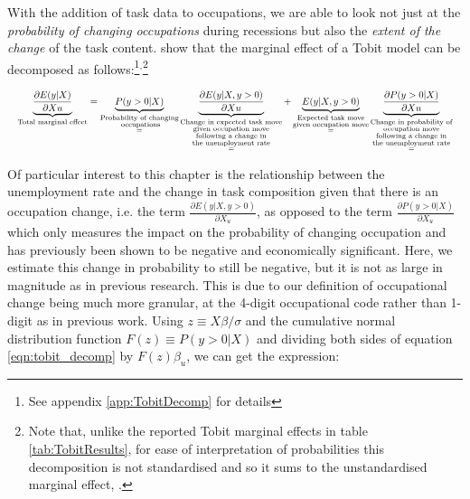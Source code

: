 \documentclass[11pt, oneside]{article}
\begin{document}
With the addition of task data to occupations, we are able to look not just at the \textit{probability of changing occupations} during recessions but also the \textit{extent of the change} of the task content. \cite{Mcdonald1980} show that the marginal effect of a Tobit model can be decomposed as follows:\footnote{See appendix \ref{app:TobitDecomp} for details}$^{,}$\footnote{Note that, unlike the reported Tobit marginal effects in table \ref{tab:TobitResults}, for ease of interpretation of probabilities this decomposition is not standardised and so it sums to the unstandardised marginal effect, \hspace{-1mm}.}


\begin{equation}
\resizebox{\columnwidth}{!}{$\displaystyle
	\label{eqn:tobit_decomp}
	\underbrace{\frac{\partial E(y| X)}{\partial Xu}}_{\text{Total marginal effect}} = \underbrace{P(y>0|X)}_{\substack{\text{Probability of changing} \\ \text{ occupations}\\=}}\underbrace{\frac{\partial E(y|X, y>0)}{\partial Xu}}_{\substack{\text{Change in expected task move} \\ \text{given occupation move} \\ \text{following a change in} \\ \text{the unemployment rate} \\ =}} + \underbrace{ E(y|X, y>0)}_{\substack{\text{Expected task move} \\ \text{given occupation move}\\=}} \underbrace{\frac{\partial P(y>0|X)}{\partial Xu}}_{\substack{\text{Change in probability of} \\ \text{occupation move}  \\ \text{following a change in} \\ \text{the unemployment rate}\\=}}
	$}
\end{equation}


\vspace{3mm}
Of particular interest to this chapter is the relationship between the unemployment rate and the change in task composition given that there is an occupation change, i.e. the term $\frac{\partial E(y|X, y>0)}{\partial X_{u}}$, as opposed to the term $\frac{\partial P(y>0|X)}{\partial X_u}$ which only measures the impact on the probability of changing occupation and has previously been shown to be negative and economically significant. Here, we estimate this change in probability to still be negative, but it is not as large in magnitude as in previous research. This is due to our definition of occupational change being much more granular, at the 4-digit occupational code rather than 1-digit as in previous work.
Using $z \equiv X\beta/\sigma$ and the cumulative normal distribution function $F(z)\equiv P(y>0|X)$ and dividing both sides of equation \ref{eqn:tobit_decomp} by $F(z)\beta_{u}$, we can get the expression:
\end{document}
